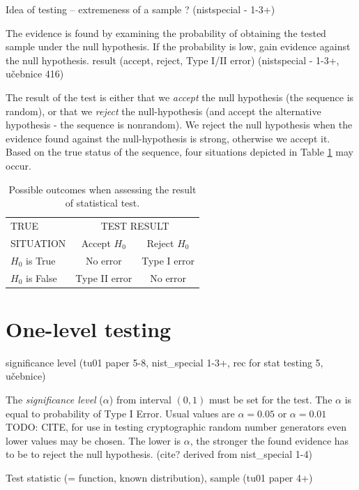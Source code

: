 \documentclass[
  digital,     %
  oneside,     %
  nosansbold,  %
  nocolorbold, %
  nolof,         %
  nolot,         %
]{fithesis4}
\begin{document}
Idea of testing – extremeness of a sample ? (nistspecial - 1-3+)

The evidence is found by examining the probability of obtaining the tested sample under the null hypothesis. If the probability is low, gain evidence against the null hypothesis.
result (accept, reject, Type I/II error) (nistspecial - 1-3+, učebnice 416)

The result of the test is either that we \emph{accept} the null hypothesis (the sequence is random), or that we \emph{reject} the null-hypothesis (and accept the alternative hypothesis - the sequence is nonrandom). We reject the null hypothesis when the evidence found against the null-hypothesis is strong, otherwise we accept it. Based on the true status of the sequence, four situations depicted in Table \ref{tab:type_errors} may occur.

\begin{table}
  \begin{tabularx}{0.7\textwidth}{l|c|c}
    TRUE  & \multicolumn{2}{c}{TEST RESULT}\\
    SITUATION &Accept $H_0$ & Reject $H_0$\\
    \midrule
    $H_0$ is True &  No error & Type I error  \\
    $H_0$ is False & Type II error & No error \\
  \end{tabularx}
  \caption{Possible outcomes when assessing the result of statistical test.}
  \label{tab:type_errors}
\end{table}

\section{One-level testing}

significance level (tu01 paper 5-8, nist_special 1-3+, rec for stat testing 5, učebnice)

The \emph{significance level} ($\alpha$) from interval $(0,1)$ must be set for the test. The $\alpha$ is equal to probability of Type I Error. Usual values are $\alpha = 0.05$ or $\alpha = 0.01$ TODO: CITE, for use in testing cryptographic random number generators even lower values may be chosen. \cite[p. 1-4]{nist_special} The lower is $\alpha$, the stronger the found evidence has to be to reject the null hypothesis. (cite? derived from nist_special 1-4)

Test statistic (= function, known distribution), sample (tu01 paper 4+)
\end{document}
